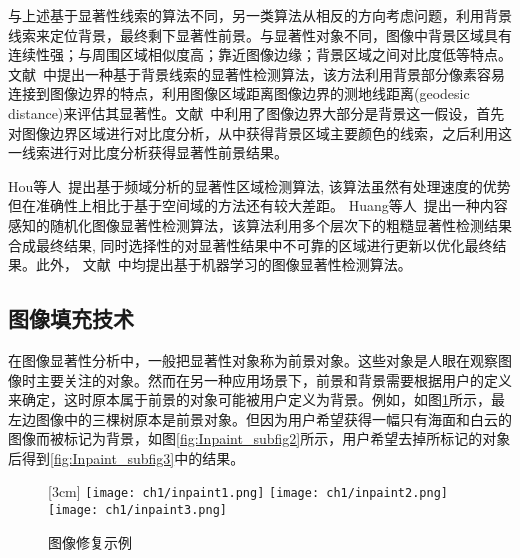 与上述基于显著性线索的算法不同，另一类算法从相反的方向考虑问题，利用背景线索来定位背景，最终剩下显著性前景。与显著性对象不同，图像中背景区域具有连续性强；与周围区域相似度高；靠近图像边缘；背景区域之间对比度低等特点。文献~\cite{geodesicDistance}中提出一种基于背景线索的显著性检测算法，该方法利用背景部分像素容易连接到图像边界的特点，利用图像区域距离图像边界的测地线距离(geodesic distance)来评估其显著性。文献~中利用了图像边界大部分是背景这一假设，首先对图像边界区域进行对比度分析，从中获得背景区域主要颜色的线索，之后利用这一线索进行对比度分析获得显著性前景结果。\par
Hou等人~\cite{SpectralSaliency}提出基于频域分析的显著性区域检测算法, 该算法虽然有处理速度的优势但在准确性上相比于基于空间域的方法还有较大差距。 Huang等人~\cite{Huang2011}提出一种内容感知的随机化图像显著性检测算法，该算法利用多个层次下的粗糙显著性检测结果合成最终结果, 同时选择性的对显著性结果中不可靠的区域进行更新以优化最终结果。此外， 文献~中均提出基于机器学习的图像显著性检测算法。

\subsection{图像填充技术}
\label{sec:imageInpainting}
在图像显著性分析中，一般把显著性对象称为前景对象。这些对象是人眼在观察图像时主要关注的对象。然而在另一种应用场景下，前景和背景需要根据用户的定义来确定，这时原本属于前景的对象可能被用户定义为背景。例如，如图\ref{fig:inpainting}所示，最左边图像中的三棵树原本是前景对象。但因为用户希望获得一幅只有海面和白云的图像而被标记为背景，如图\ref{fig:Inpaint_subfig2}所示，用户希望去掉所标记的对象后得到\ref{fig:Inpaint_subfig3}中的结果。

\begin{figure}[ht]
  \centering%
  [3cm] %
    {\texttt{[image: ch1/inpaint1.png]}}%
  \hspace{4em}%
     {\texttt{[image: ch1/inpaint2.png]}}
  \hspace{1em}%
    {\texttt{[image: ch1/inpaint3.png]}}
  \caption{图像修复示例~\cite{Criminisi04regionfilling}}
  \label{fig:inpainting}
\end{figure}

